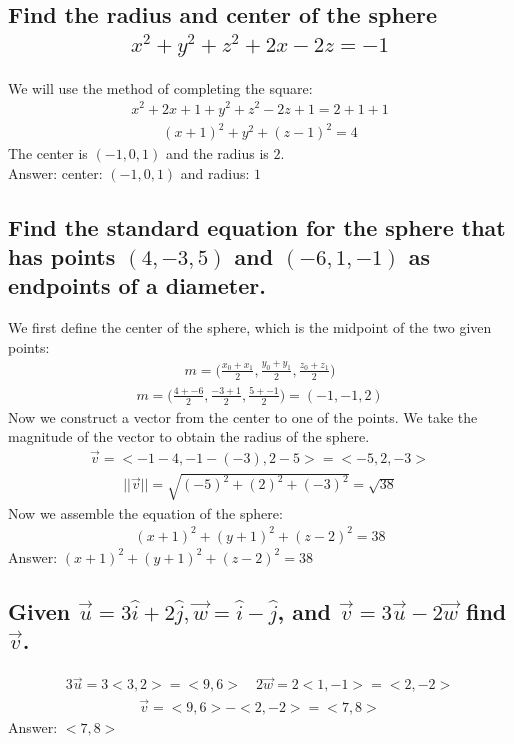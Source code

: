 \documentclass{article}
\begin{document}
\subsection{Find the radius and center of the sphere
	\begin{align*}
		x^2 + y^2 + z^2 + 2x - 2z = -1
	\end{align*}
}
We will use the method of completing the square:
\begin{align*}
	x^2 + 2x + 1 + y^2 + z^2 -2z + 1 = 2 + 1 + 1
\end{align*}
\begin{align*}
	(x + 1)^2 + y^2 + (z - 1)^2 = 4
\end{align*}
The center is $(-1, 0, 1)$ and the radius is $2$. \\[10pt]
Answer: center: $(-1, 0, 1)$ and radius: $1$
\subsection{Find the standard equation for the sphere that has points $(4, -3, 5)$ and $(-6, 1, -1)$ as endpoints of a diameter.
}
We first define the center of the sphere, which is the midpoint of the two given points:
\begin{align*}
	m = \bigg( \frac{x_0 + x_1}{2}, \frac{y_0 + y_1}{2}, \frac{z_0 + z_1}{2}\bigg)
\end{align*}
\begin{align*}
	m = \bigg( \frac{4 + -6}{2}, \frac{-3 + 1}{2}, \frac{5 + -1}{2}\bigg) = ( -1, -1, 2 )
\end{align*}
Now we construct a vector from the center to one of the points. We take the magnitude of the vector to obtain the radius of the sphere.
\begin{align*}
	\vec{v} = <-1 - 4, -1 - (-3), 2 - 5> = <-5, 2, -3>
\end{align*}
\begin{align*}
	|| \vec{v} || = \sqrt{(-5)^2 + (2)^2 + (-3)^2} = \sqrt{38}
\end{align*}
Now we assemble the equation of the sphere:
\begin{align*}
	(x + 1)^2 + (y + 1)^2 + (z - 2)^2 = 38
\end{align*}
Answer: $(x + 1)^2 + (y + 1)^2 + (z - 2)^2 = 38$
\subsection{Given $\vec{u} = 3\hat{i} + 2\hat{j}, \vec{w} = \hat{i} - \hat{j}$, and $\vec{v} = 3\vec{u} - 2\vec{w}$ find $\vec{v}$.}
\begin{align*}
	3\vec{u} = 3<3, 2> = <9, 6> \quad 2\vec{w} = 2<1, -1> = <2, -2>
\end{align*}
\begin{align*}
	\vec{v} = <9, 6> - <2, -2> = <7, 8>
\end{align*}
Answer: $<7, 8>$
\end{document}
